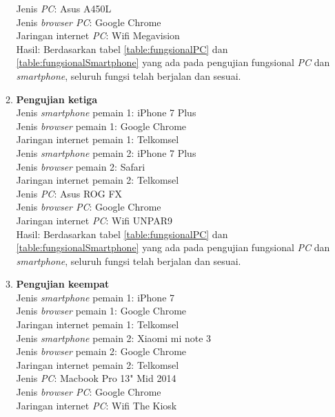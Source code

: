 \begin{enumerate}
\begin{enumerate}
		Jenis \textit{PC}: Asus A450L\\
		Jenis \textit{browser PC}: Google Chrome\\
		Jaringan internet \textit{PC}: Wifi Megavision\\
		
		Hasil: Berdasarkan tabel \ref{table:fungsionalPC} dan \ref{table:fungsionalSmartphone} yang ada pada pengujian fungsional \textit{PC} dan \textit{smartphone}, seluruh fungsi telah berjalan dan sesuai.
		
		\item \textbf{Pengujian ketiga} \\
		Jenis \textit{smartphone} pemain 1: iPhone 7 Plus\\
		Jenis \textit{browser} pemain 1: Google Chrome\\
		Jaringan internet pemain 1: Telkomsel\\
		
		Jenis \textit{smartphone} pemain 2: iPhone 7 Plus\\
		Jenis \textit{browser} pemain 2: Safari\\
		Jaringan internet pemain 2: Telkomsel\\
		
		Jenis \textit{PC}: Asus ROG FX\\
		Jenis \textit{browser PC}: Google Chrome\\
		Jaringan internet \textit{PC}: Wifi UNPAR9\\
		
		Hasil: Berdasarkan tabel \ref{table:fungsionalPC} dan \ref{table:fungsionalSmartphone} yang ada pada pengujian fungsional \textit{PC} dan \textit{smartphone}, seluruh fungsi telah berjalan dan sesuai.
		
		\item \textbf{Pengujian keempat} \\
		Jenis \textit{smartphone} pemain 1: iPhone 7\\
		Jenis \textit{browser} pemain 1: Google Chrome\\
		Jaringan internet pemain 1: Telkomsel\\
		
		Jenis \textit{smartphone} pemain 2: Xiaomi mi note 3\\
		Jenis \textit{browser} pemain 2: Google Chrome\\
		Jaringan internet pemain 2: Telkomsel\\
		
		Jenis \textit{PC}: Macbook Pro 13" Mid 2014\\
		Jenis \textit{browser PC}: Google Chrome\\
		Jaringan internet \textit{PC}: Wifi The Kiosk\\
		

\end{enumerate}
\end{enumerate}
